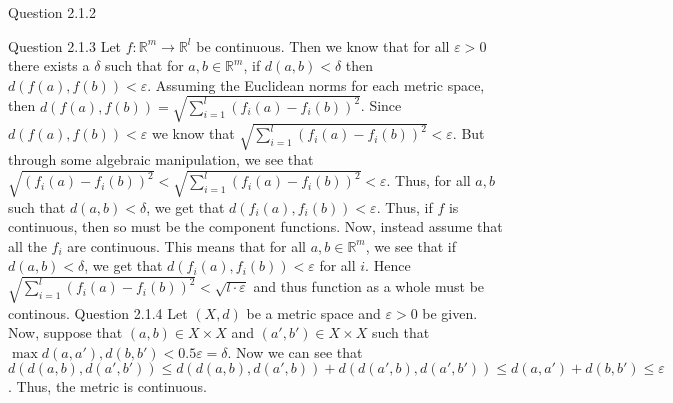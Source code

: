 \documentclass[12pt]{exam}
\begin{document}
\begin{questions}
\question Question 2.1.2
\question Question 2.1.3\newline
Let $f: \mathbb{R}^m \rightarrow \mathbb{R}^l$ be continuous. Then we know that for all $\varepsilon >0$ there exists a $\delta$ such that for $a,b \in \mathbb{R}^m$, if $d(a,b) < \delta$ then $d(f(a), f(b)) < \varepsilon$. Assuming the Euclidean norms for each metric space, then $d(f(a), f(b)) = \sqrt{\sum_{i = 1}^{l} (f_i(a) - f_i(b))^2}$. Since $d(f(a), f(b)) < \varepsilon$ we know that $\sqrt{\sum_{i = 1}^{l} (f_i(a) - f_i(b))^2} < \varepsilon$. But through some algebraic manipulation, we see that $\sqrt{(f_i(a)-f_i(b))^2} < \sqrt{\sum_{i = 1}^{l} (f_i(a) - f_i(b))^2} < \varepsilon$. Thus, for all $a,b$ such that $d(a,b)< \delta$, we get that $d(f_i(a), f_i(b)) < \varepsilon$. Thus, if $f$ is continuous, then so must be the component functions. Now, instead assume that all the $f_i$ are continuous. This means that for all $a,b \in \mathbb{R}^m$, we see that if $d(a,b) < \delta$, we get that $d(f_i(a), f_i(b)) < \varepsilon$ for all $i$. Hence $\sqrt{\sum_{i = 1}^{l} (f_i(a) - f_i(b))^2} < \sqrt{l \cdot \varepsilon}$ and thus function as a whole must be continous. 
\question Question 2.1.4\newline
Let $(X, d)$ be a metric space and $\varepsilon > 0$ be given. Now, suppose that $(a,b) \in X \times X$ and $(a', b') \in X \times X$ such that $\max{d(a, a'), d(b, b')} < 0.5\varepsilon = \delta$. Now we can see that $d(d(a,b), d(a',b')) \leq d(d(a,b), d(a',b)) + d(d(a', b), d(a', b')) \leq d(a, a') + d(b, b') \leq \varepsilon$. Thus, the metric is continuous. 


\end{questions}
\end{document}
